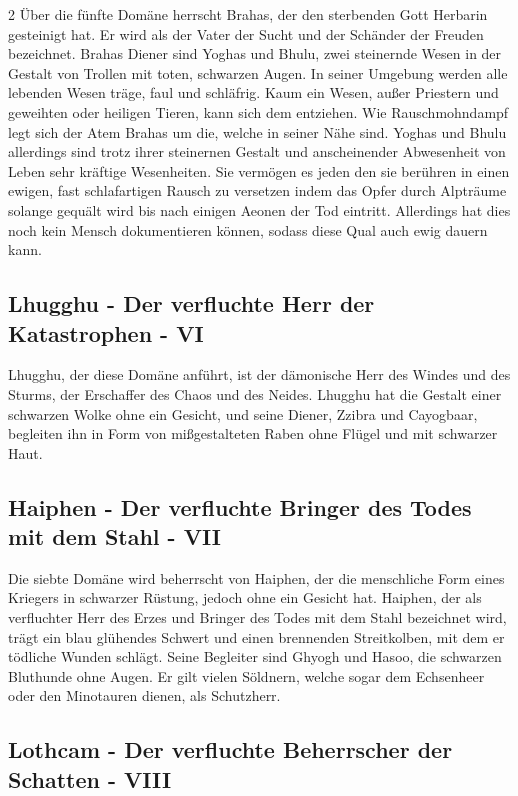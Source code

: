 \begin{multicols*}{2}
Über die fünfte Domäne herrscht Brahas, der den sterbenden Gott Herbarin gesteinigt hat.
Er wird als der Vater der Sucht und der Schänder der Freuden bezeichnet.
Brahas Diener sind Yoghas und Bhulu, zwei steinernde Wesen in der Gestalt von Trollen mit toten, schwarzen Augen.
In seiner Umgebung werden alle lebenden Wesen träge, faul und schläfrig.
Kaum ein Wesen, außer Priestern und geweihten oder heiligen Tieren, kann sich dem entziehen.
Wie Rauschmohndampf legt sich der Atem Brahas um die, welche in seiner Nähe sind.
Yoghas und Bhulu allerdings sind trotz ihrer steinernen Gestalt und anscheinender Abwesenheit von Leben sehr kräftige Wesenheiten.
Sie vermögen es jeden den sie berühren in einen ewigen, fast schlafartigen Rausch zu versetzen indem das Opfer durch Alpträume solange gequält wird bis nach einigen Aeonen der Tod eintritt.
Allerdings hat dies noch kein Mensch dokumentieren können, sodass diese Qual auch ewig dauern kann.

\subsection{Lhugghu - Der verfluchte Herr der Katastrophen - VI}\label{subsec:lhugghu-der-verfluchte-herr-der-katastrophen}

Lhugghu, der diese Domäne anführt, ist der dämonische Herr des Windes und des Sturms, der Erschaffer des Chaos und des Neides.
Lhugghu hat die Gestalt einer schwarzen Wolke ohne ein Gesicht, und seine Diener, Zzibra und Cayogbaar, begleiten ihn in Form von mißgestalteten Raben ohne Flügel und mit schwarzer Haut.

\subsection{Haiphen - Der verfluchte Bringer des Todes mit dem Stahl - VII}\label{subsec:haiphen-der-verfluchte-bringer-des-todes-mit-dem-stahl}

Die siebte Domäne wird beherrscht von Haiphen, der die menschliche Form eines Kriegers in schwarzer Rüstung, jedoch ohne ein Gesicht hat.
Haiphen, der als verfluchter Herr des Erzes und Bringer des Todes mit dem Stahl bezeichnet wird, trägt ein blau glühendes Schwert und einen brennenden Streitkolben, mit dem er tödliche Wunden schlägt.
Seine Begleiter sind Ghyogh und Hasoo, die schwarzen Bluthunde ohne Augen.
Er gilt vielen Söldnern, welche sogar dem Echsenheer oder den Minotauren dienen, als Schutzherr.

\subsection{Lothcam - Der verfluchte Beherrscher der Schatten - VIII}\label{subsec:lothcam-der-verfluchte-beherrscher-der-schatten}


\end{multicols*}
